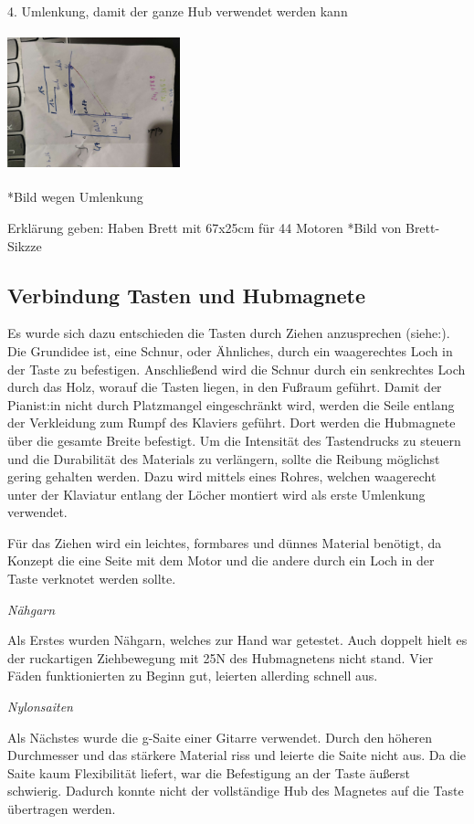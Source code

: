 4. Umlenkung, damit der ganze Hub verwendet werden kann

\includegraphics [width=5cm, height=4cm,angle=-90] {img/skizze_Umlenkung}

*Bild wegen Umlenkung

Erklärung geben: Haben Brett mit 67x25cm für 44 Motoren
*Bild von Brett-Sikzze



\subsection{Verbindung Tasten und Hubmagnete}

Es wurde sich dazu entschieden die Tasten durch Ziehen anzusprechen (siehe:).
Die Grundidee ist, eine Schnur, oder Ähnliches, durch ein waagerechtes Loch in der Taste zu befestigen.
Anschließend wird die Schnur durch ein senkrechtes Loch durch das Holz, worauf die Tasten liegen, in den Fußraum geführt.
Damit der Pianist:in nicht durch Platzmangel eingeschränkt wird, werden die Seile entlang der Verkleidung zum Rumpf des Klaviers geführt.
Dort werden die Hubmagnete über die gesamte Breite befestigt.
Um die Intensität des Tastendrucks zu steuern und die Durabilität des Materials zu verlängern, sollte die Reibung möglichst gering gehalten werden.
Dazu wird mittels eines Rohres, welchen waagerecht unter der Klaviatur entlang der Löcher montiert wird als erste Umlenkung verwendet.


Für das Ziehen wird ein leichtes, formbares und dünnes Material benötigt, da Konzept die eine Seite mit dem Motor und die andere durch ein Loch in der Taste verknotet werden sollte.

\textit{Nähgarn}

Als Erstes wurden Nähgarn, welches zur Hand war getestet.
Auch doppelt hielt es der ruckartigen Ziehbewegung mit 25N des Hubmagnetens nicht stand.
Vier Fäden funktionierten zu Beginn gut, leierten allerding schnell aus.

\textit{Nylonsaiten}

Als Nächstes wurde die g-Saite einer Gitarre verwendet.
Durch den höheren Durchmesser und das stärkere Material riss und leierte die Saite nicht aus.
Da die Saite kaum Flexibilität liefert, war die Befestigung an der Taste äußerst schwierig.
Dadurch konnte nicht der vollständige Hub des Magnetes auf die Taste übertragen werden.

